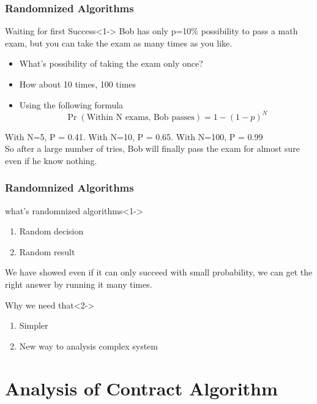 \documentclass{beamer}
\begin{document}
\begin{frame}
\frametitle{Randomnized Algorithms }
\begin{block}{Waiting for first Success}<1->
Bob has only p=10\% possibility to pass a math exam, but you can take the exam as many times as you like. 
\begin{itemize}
	\item What's possibility of taking the exam only once?
	\item How about 10 times, 100 times 
\end{itemize}
\end{block}
\begin{itemize}
	\item Using the following formula 
	\begin{equation*}
	\Pr\left(\text{Within N exams, Bob passes}\right)=1-(1-p)^N
	\end{equation*}
\end{itemize}
With N=5, P = 0.41. With N=10, P = 0.65.
With N=100, P = 0.99 \\
So after a large number of tries, Bob will finally pass the exam for almost sure even if he know nothing.

\end{frame}
\begin{frame}
\frametitle{Randomnized Algorithms}
\begin{block}{ what's randomnized algorithms}<1->
\begin{enumerate}
	\item Random decision
	\item Random result
\end{enumerate}
We have showed even if it can only succeed with small probability, we can get the right answer by running it many times. 	
\end{block}
\begin{block}{Why we need that}<2->
\begin{enumerate}
	\item Simpler
	\item New way to analysis complex system
\end{enumerate}
\end{block}
\end{frame}
\section{Analysis of Contract Algorithm}
\end{document}

